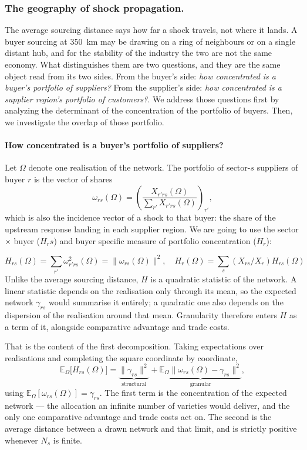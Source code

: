 \subsubsection{The geography of shock propagation.}
The average sourcing distance says how far a shock travels, not where it lands. A buyer sourcing at 350~km may be drawing on a ring of neighbours or on a single distant hub, and for the stability of the industry the two are not the same economy. What distinguishes them are two questions, and they are the same object read from its two sides. From the buyer's side: \emph{how concentrated is a buyer's portfolio of suppliers?} From the supplier's side: \emph{how concentrated is a supplier region's portfolio of customers?}. We address those questions first by analyzing the determinant of the concentration of the portfolio of buyers. Then, we investigate the overlap of those portfolio. 

\paragraph{How concentrated is a buyer's portfolio of suppliers?}
Let $\Omega$ denote one realisation of the network. The portfolio of sector-$s$ suppliers of buyer $r$ is the vector of shares
\begin{equation}
\omega_{rs}(\Omega)=\left(\frac{X_{r'rs}(\Omega)}{\sum_{r'}X_{r'rs}(\Omega)}\right)_{r'},
\label{eq:incidence_vector}
\end{equation}
which is also the incidence vector of a shock to that buyer: the share of the upstream response landing in each supplier region. We are going to use the sector $\times$ buyer ($H_rs$) and buyer specific measure of portfolio concentration ($H_r$):

$$H_{rs}(\Omega)=\sum_{r'}\omega_{r'rs}^{2}(\Omega)=\big\|\omega_{rs}(\Omega)\big\|^{2}, \quad H_{r}(\Omega)=\sum_{s}(X_{rs}/X_{r})H_{rs}(\Omega)$$
Unlike the average sourcing distance, $H$ is a quadratic statistic of the network. A linear statistic depends on the realisation only through its mean, so the expected network $\gamma_{rs}$ would summarise it entirely; a quadratic one also depends on the dispersion of the realisation around that mean. Granularity therefore enters $H$ as a term of it, alongside comparative advantage and trade costs.

That is the content of the first decomposition. Taking expectations over realisations and completing the square coordinate by coordinate,
\begin{equation}
\mathbb{E}_{\Omega}\big[H_{rs}(\Omega)\big]
=\underbrace{\big\|\gamma_{rs}\big\|^{2}}_{\text{structural}}
+\underbrace{\mathbb{E}_{\Omega}\big\|\omega_{rs}(\Omega)-\gamma_{rs}\big\|^{2}}_{\text{granular}},
\label{eq:variety_split}
\end{equation}
using $\mathbb{E}_{\Omega}[\omega_{rs}(\Omega)]=\gamma_{rs}$. The first term is the concentration of the expected network --- the allocation an infinite number of varieties would deliver, and the only one comparative advantage and trade costs act on. The second is the average distance between a drawn network and that limit, and is strictly positive whenever $N_{s}$ is finite.

